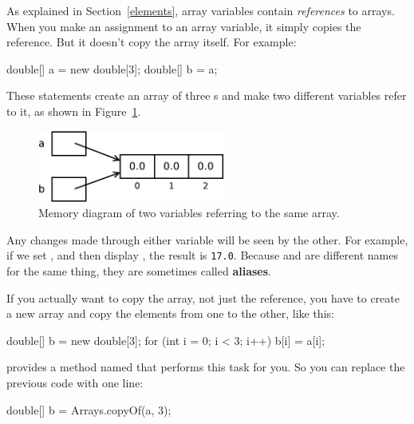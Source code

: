 As explained in Section~\ref{elements}, array variables contain {\em references} to arrays.
When you make an assignment to an array variable, it simply copies the reference.
But it doesn't copy the array itself.
For example:

\begin{code}
double[] a = new double[3];
double[] b = a;
\end{code}

These statements create an array of three s and make two different variables refer to it, as shown in Figure~\ref{fig.array3}.



\begin{figure}[!ht]
\begin{center}
\includegraphics[width=175pt]{figs/array3.pdf}
\caption{Memory diagram of two variables referring to the same array.}
\label{fig.array3}
\end{center}
\end{figure}


Any changes made through either variable will be seen by the other.
For example, if we set , and then display , the result is {\tt 17.0}.
Because  and  are different names for the same thing, they are sometimes called {\bf aliases}.

If you actually want to copy the array, not just the reference, you have to create a new array and copy the elements from one to the other, like this:

\begin{code}
double[] b = new double[3];
for (int i = 0; i < 3; i++) {
    b[i] = a[i];
}
\end{code}


 provides a method named  that performs this task for you.
So you can replace the previous code with one line:

\begin{code}
double[] b = Arrays.copyOf(a, 3);
\end{code}

